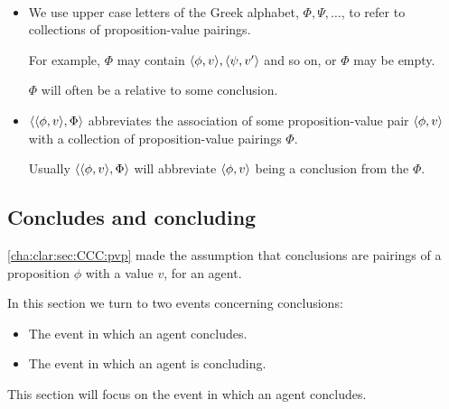 \begin{note}
  \begin{notation}[\poP{3}]
    \mbox{ }
    \vspace{-\baselineskip}
    \begin{itemize}
    \item
      We use upper case letters of the Greek alphabet, \(\Phi, \Psi, \dots\), to refer to collections of proposition-value pairings.

      For example, \(\Phi\) may contain \(\langle \phi, v \rangle, \langle \psi, v' \rangle\) and so on, or \(\Phi\) may be empty.

      \(\Phi\) will often be a \poP{} relative to some conclusion.
    \item
      \(\langle \langle \phi, v \rangle, \Phi \rangle\) abbreviates the association of some proposition-value pair \(\langle \phi, v \rangle\) with a collection of proposition-value pairings \(\Phi\).

      Usually \(\langle \langle \phi, v \rangle, \Phi \rangle\) will abbreviate \(\langle \phi, v \rangle\) being a conclusion from the \poP{} \(\Phi\).
    \end{itemize}
  \end{notation}
\end{note}

\subsection{Concludes and concluding}
\label{cha:clar:sec:CCC:c-and-c}

\begin{note}
  \autoref{cha:clar:sec:CCC:pvp} made the assumption that conclusions are pairings of a proposition \(\phi\) with a value \(v\), for an agent.

  In this section we turn to two events concerning conclusions:
  \begin{itemize}
  \item
    The event in which an agent concludes.
  \item
    The event in which an agent is concluding.
  \end{itemize}
  This section will focus on the event in which an agent concludes.
\end{note}

